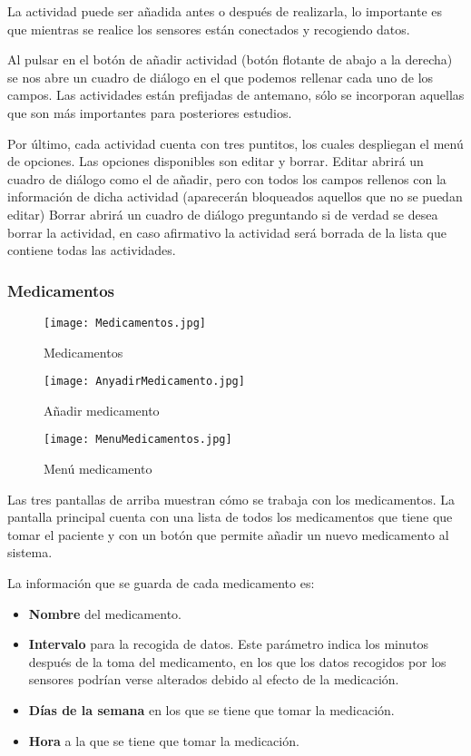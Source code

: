 \documentclass[11pt,spanish]{article}
\begin{document}
La actividad puede ser añadida antes o después de realizarla, lo importante es que mientras se realice los sensores están conectados y recogiendo datos.
\newline

Al pulsar en el botón de añadir actividad (botón flotante de abajo a la derecha) se nos abre un cuadro de diálogo en el que podemos rellenar cada uno de los campos. Las actividades están prefijadas de antemano, sólo se incorporan aquellas que son más importantes para posteriores estudios.
\newline

Por último, cada actividad cuenta con tres puntitos, los cuales despliegan el menú de opciones. Las opciones disponibles son editar y borrar. Editar abrirá un cuadro de diálogo como el de añadir, pero con todos los campos rellenos con la información de dicha actividad (aparecerán bloqueados aquellos que no se puedan editar) Borrar abrirá un cuadro de diálogo preguntando si de verdad se desea borrar la actividad, en caso afirmativo la actividad será borrada de la lista que contiene todas las actividades.

\subsubsection{Medicamentos}
\begin{figure}[!htb]
  \texttt{[image: Medicamentos.jpg]}
  \caption{Medicamentos}
\endminipage\hfill
{}
  \texttt{[image: AnyadirMedicamento.jpg]}
  \caption{Añadir medicamento}
\endminipage\hfill
{}%
  \texttt{[image: MenuMedicamentos.jpg]}
  \caption{Menú medicamento}
\endminipage
\end{figure}

Las tres pantallas de arriba muestran cómo se trabaja con los medicamentos. La pantalla principal cuenta con una lista de todos los medicamentos que tiene que tomar el paciente y con un botón que permite añadir un nuevo medicamento al sistema.
\newline

La información que se guarda de cada medicamento es:

\begin{itemize}
	\item {\bf Nombre} del medicamento.
	\item {\bf Intervalo} para la recogida de datos. Este parámetro indica los minutos después de la toma del medicamento, en los que los datos recogidos por los sensores podrían verse alterados debido al efecto de la medicación.
	\item {\bf Días de la semana} en los que se tiene que tomar la medicación.
	\item {\bf Hora} a la que se tiene que tomar la medicación.
\end{itemize}
\end{document}
